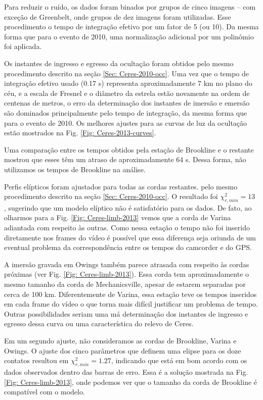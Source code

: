 \documentclass[12pt,a4paper]{monografia}
\begin{document}
Para reduzir o ruído, os dados foram binados por grupos de cinco imagens -- com exceção de Greenbelt, onde grupos de dez imagens foram utilizadas. Esse procedimento o tempo de integração efetivo por um fator de 5 (ou 10). Da mesma forma que para o evento de 2010, uma normalização adicional por um polinômio foi aplicada.

Os instantes de ingresso e egresso da ocultação foram obtidos pelo mesmo procedimento descrito na seção \ref{Sec: Ceres-2010-occ}. Uma vez que o tempo de integração efetivo usado (0.17 s) representa aproximadamente 7 km no plano do céu, e a escala de Fresnel e  o diâmetro da estrela estão novamente na ordem de centenas de metros, o erro da determinação dos instantes de imersão e emersão são dominados principalmente pelo tempo de integração, da mesma forma que para o evento de 2010. Os melhores ajustes para as curvas de luz da ocultação estão mostrados na Fig. \ref{Fig: Ceres-2013-curves}.

Uma comparação entre os tempos obtidos pela estação de Brookline e o restante mostrou que esses têm um atraso de aproximadamente 64 s. Dessa forma, não utilizamos os tempos de Brookline na análise.

Perfis elípticos foram ajustados para todas as cordas restantes. pelo mesmo procedimento descrito na seção \ref{Sec: Ceres-2010-occ}. O resultado foi $\chi^2_{r,min} = 13$ , sugerindo que um modelo elíptico não é satisfatório para os dados. De fato, ao olharmos para a Fig. \ref{Fig: Ceres-limb-2013} vemos que a corda de Varina adiantada com respeito às outras. Como nessa estação o tempo não foi inserido diretamente nos frames do vídeo é possível que essa diferença seja oriunda de um eventual problema da correspondência entre os tempos do camcorder e do GPS.

A imersão gravada em Owings também parece atrasada com respeito às cordas próximas (ver Fig. \ref{Fig: Ceres-limb-2013}). Essa corda tem aproximadamente o mesmo tamanho da corda de Mechanicsville, apesar de estarem separadas por cerca de 100 km. Diferentemente de Varina, essa estação teve os tempos inseridos em cada frame do vídeo o que torna mais difícil justificar um problema de tempo. Outras possibilidades seriam uma má determinação dos instantes de ingresso e egresso dessa curva ou uma característica do relevo de Ceres.

Em um segundo ajuste, não consideramos as cordas de Brookline, Varina e Owings. O ajuste dos cinco parâmetros que definem uma elipse para os doze contatos resultou em $\chi^2_{r,min} = 1.27$, indicando  que está em bom acordo com os dados observados dentro das barras de erro. Essa é a solução mostrada na Fig. \ref{Fig: Ceres-limb-2013}, onde podemos ver que o tamanho da corda de Brookline é compatível com o modelo.
\end{document}
